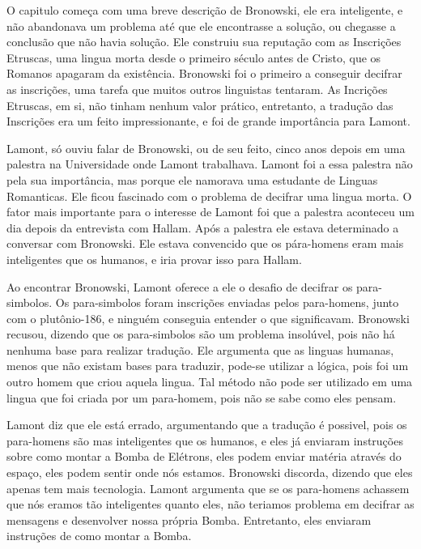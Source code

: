 \documentclass[14pt,portuguese]{extreport}
\begin{document}
    	  O capitulo começa com uma breve descrição de Bronowski, ele era inteligente, e não abandonava um problema até que ele encontrasse a solução, ou chegasse a conclusão que não havia solução. Ele construiu sua reputação com as Inscrições Etruscas, uma lingua morta desde o primeiro século antes de Cristo, que os Romanos apagaram da existência. Bronowski foi o primeiro a conseguir decifrar as inscrições, uma tarefa que muitos outros linguistas tentaram. As Incrições Etruscas, em si, não tinham nenhum valor prático, entretanto, a tradução das Inscrições era um feito impressionante, e foi de grande importância para Lamont.
	
    	  Lamont, só ouviu falar de Bronowski, ou de seu feito, cinco anos depois em uma palestra na Universidade onde Lamont trabalhava. Lamont foi a essa palestra não pela sua importância, mas porque ele namorava uma estudante de Linguas Romanticas. Ele ficou fascinado com o problema de decifrar uma lingua morta. O fator mais importante para o interesse de Lamont foi que a palestra aconteceu um dia depois da entrevista com Hallam. Após a palestra ele estava determinado a conversar com Bronowski. Ele estava convencido que os pára-homens eram mais inteligentes que os humanos, e iria provar isso para Hallam.
    	
    	  Ao encontrar Bronowski, Lamont oferece a ele o desafio de decifrar os para-simbolos. Os para-simbolos foram inscrições enviadas pelos para-homens, junto com o plutônio-186, e ninguém conseguia entender o que significavam. Bronowski recusou, dizendo que os para-simbolos são um problema insolúvel, pois não há nenhuma base para realizar tradução. Ele argumenta que as linguas humanas, menos que não existam bases para traduzir, pode-se utilizar a lógica, pois foi um outro homem que criou aquela lingua. Tal método não pode ser utilizado em uma lingua que foi criada por um para-homem, pois não se sabe como eles pensam. 

        Lamont diz que ele está errado, argumentando que a tradução é possivel, pois os para-homens são mas inteligentes que os humanos, e eles já enviaram instruções sobre como montar a Bomba de Elétrons, eles podem enviar matéria através do espaço, eles podem sentir onde nós estamos. Bronowski discorda, dizendo que eles apenas tem mais tecnologia. Lamont argumenta que se os para-homens achassem que nós eramos tão inteligentes quanto eles, não teriamos problema em decifrar as mensagens e desenvolver nossa própria Bomba. Entretanto, eles enviaram instruções de como montar a Bomba. 
\end{document}
